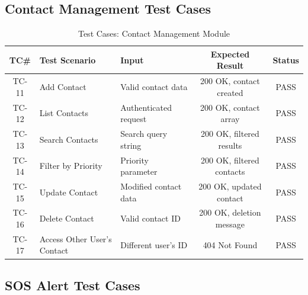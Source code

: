 \subsection{Contact Management Test Cases}

\begin{table}[H]
  \centering
  \caption{Test Cases: Contact Management Module}
  \label{tab:tc-contacts}
  \begin{tabularx}{\textwidth}{@{}c l X c c@{}}
    \toprule
    \textbf{TC\#} & \textbf{Test Scenario} & \textbf{Input} & \textbf{Expected Result} & \textbf{Status} \\
    \midrule
    TC-11 & Add Contact & Valid contact data & 200 OK, contact created & \textcolor{green!70!black}{PASS} \\
    TC-12 & List Contacts & Authenticated request & 200 OK, contact array & \textcolor{green!70!black}{PASS} \\
    TC-13 & Search Contacts & Search query string & 200 OK, filtered results & \textcolor{green!70!black}{PASS} \\
    TC-14 & Filter by Priority & Priority parameter & 200 OK, filtered contacts & \textcolor{green!70!black}{PASS} \\
    TC-15 & Update Contact & Modified contact data & 200 OK, updated contact & \textcolor{green!70!black}{PASS} \\
    TC-16 & Delete Contact & Valid contact ID & 200 OK, deletion message & \textcolor{green!70!black}{PASS} \\
    TC-17 & Access Other User's Contact & Different user's ID & 404 Not Found & \textcolor{green!70!black}{PASS} \\
    \bottomrule
  \end{tabularx}
\end{table}

\subsection{SOS Alert Test Cases}

